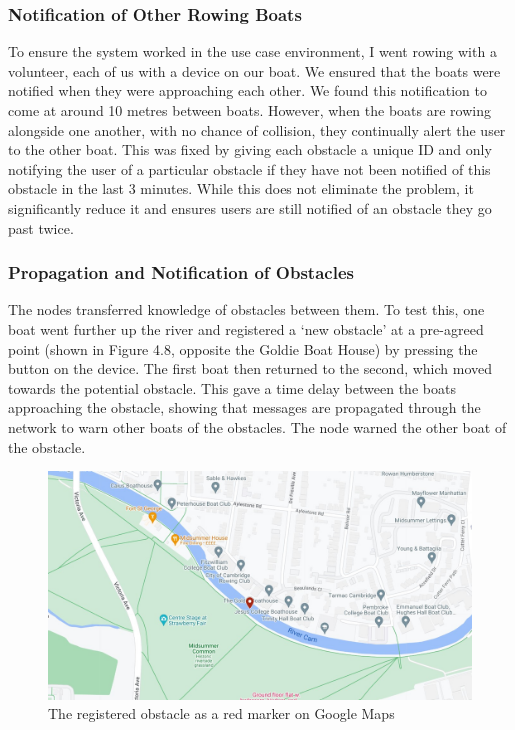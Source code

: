 \documentclass[12pt,a4paper]{report}
\begin{document}
\subsubsection{Notification of Other Rowing Boats}
To ensure the system worked in the use case environment, I went rowing with a volunteer, each of us with a device on our boat. We ensured that the boats were notified when they were approaching each other. We found this notification to come at around 10 metres between boats. However, when the boats are rowing alongside one another, with no chance of collision, they continually alert the user to the other boat. This was fixed by giving each obstacle a unique ID and only notifying the user of a particular obstacle if they have not been notified of this obstacle in the last 3 minutes. While this does not eliminate the problem, it significantly reduce it and ensures users are still notified of an obstacle they go past twice. \\
\subsubsection{Propagation and Notification of Obstacles}
The nodes transferred knowledge of obstacles between them. To test this, one boat went further up the river and registered a `new obstacle' at a pre-agreed point (shown in Figure 4.8, opposite the Goldie Boat House) by pressing the button on the device. The first boat then returned to the second, which moved towards the potential obstacle. This gave a time delay between the boats approaching the obstacle, showing that messages are propagated through the network to warn other boats of the obstacles. The node warned the other boat of the obstacle. 
\begin{figure}[h]
\begin{center}
\includegraphics[scale=0.3]{obstacle.jpg}
\end{center}
\caption{The registered obstacle as a red marker on Google Maps \cite{googlemapsgeneral}}
\end{figure}
\end{document}
